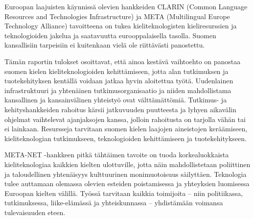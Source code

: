 \documentclass[]{../../metanetpaper}
\begin{document}
\begin{multicols}{2}
Euroopan laajuisten käynnissä olevien hankkeiden CLARIN (Common
Language Resources and Technologies Infrastructure) ja META
(Multilingual Europe Technology Alliance) tavoitteena on tukea
kieliteknologisten kieliresurssien ja teknologioiden jakelua ja
saatavuutta eurooppalaisella tasolla. Suomen kansallisiin tarpeisiin
ei kuitenkaan vielä ole riittävästi panostettu.

Tämän raportin tulokset osoittavat, että ainoa kestävä vaihtoehto on
panostaa suomen kielen kieliteknologioiden kehittämiseen, jotta alan
tutkimuksen ja tuotekehityksen kentällä voidaan jatkaa hyvin
aloitettua työtä. Uudenlainen infrastruktuuri ja yhtenäinen
tutkimusorganisaatio ja niiden mahdollistama kansallinen ja
kansainvälinen yhteistyö ovat välttämättömiä. Tutkimus- ja
kehityshankkeiden rahoitus kärsii jatkuvuuden puutteesta ja lyhyen
aikavälin ohjelmat vaihtelevat ajanjaksojen kanssa, jolloin rahoitusta
on tarjolla vähän tai ei lainkaan. Resursseja tarvitaan suomen kielen
laajojen aineistojen keräämiseen, kieliteknologian tutkimukseen,
teknologioiden kehittämiseen ja tuotekehitykseen.

META-NET -hankkeen pitkä tähtäimen tavoite on tuoda korkealuokkaista
kieliteknologiaa kaikkien kielten ulottuville, jotta näin
mahdollistetaan poliittinen ja taloudellinen yhtenäisyys kulttuurinen
monimuotoisuus säilyttäen. Teknologia tulee auttamaan olemassa olevien
esteiden poistamisessa ja yhteyksien luomisessa Euroopan kielten
välillä. Työssä tarvitaan kaikkia toimijoita – niin politiikassa,
tutkimuksessa, liike-elämässä ja yhteiskunnassa – yhdistämään voimansa
tulevaisuuden eteen.


\end{multicols}
\clearpage
{}
\end{document}
